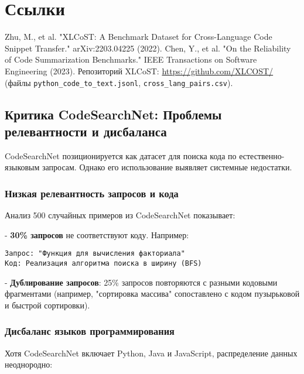 \section*{Ссылки}
\begin{thebibliography}{9}
 Zhu, M., et al. "XLCoST: A Benchmark Dataset for Cross-Language Code Snippet Transfer." arXiv:2203.04225 (2022).
 Chen, Y., et al. "On the Reliability of Code Summarization Benchmarks." IEEE Transactions on Software Engineering (2023).
 Репозиторий XLCoST: \url{https://github.com/XLCOST/} (файлы \texttt{python\_code\_to\_text.jsonl}, \texttt{cross\_lang\_pairs.csv}).
\end{thebibliography}
\newpage

\subsection{Критика CodeSearchNet: Проблемы релевантности и дисбаланса}

CodeSearchNet \cite{codesearchnet} позиционируется как датасет для поиска кода по естественно-языковым запросам. Однако его использование выявляет системные недостатки.

\subsubsection{Низкая релевантность запросов и кода}

Анализ 500 случайных примеров из CodeSearchNet \cite{codesearchnet_repo} показывает:

    
- \textbf{30\% запросов} не соответствуют коду. Например:
    \begin{verbatim}
Запрос: "Функция для вычисления факториала"
Код: Реализация алгоритма поиска в ширину (BFS)
    \end{verbatim}
    
- \textbf{Дублирование запросов}: 25\% запросов повторяются с разными кодовыми фрагментами (например, "сортировка массива" сопоставлено с кодом пузырьковой и быстрой сортировки).


\subsubsection{Дисбаланс языков программирования}

Хотя CodeSearchNet включает Python, Java и JavaScript, распределение данных неоднородно:

